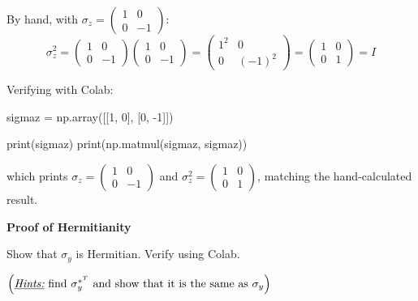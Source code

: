 \documentclass[a4paper, 10pt]{article}
\begin{document}
\begin{solution}
	By hand, with \( \sigma_z = \begin{pmatrix} 1 & 0 \\ 0 & -1 \end{pmatrix} \):
	\[
		\sigma_z^2 = \begin{pmatrix}
			1 & 0  \\
			0 & -1
		\end{pmatrix}\begin{pmatrix}
			1 & 0  \\
			0 & -1
		\end{pmatrix} = \begin{pmatrix}
			1^2 & 0      \\
			0   & (-1)^2
		\end{pmatrix} = \begin{pmatrix}
			1 & 0 \\
			0 & 1
		\end{pmatrix} = I
	\]

	Verifying with Colab:
	\begin{codingbox}
sigmaz = np.array([[1, 0], [0, -1]])

print(sigmaz)
print(np.matmul(sigmaz, sigmaz))
\end{codingbox}
	which prints \( \sigma_z = \begin{pmatrix} 1 & 0 \\ 0 & -1 \end{pmatrix} \) and \( \sigma_z^2 = \begin{pmatrix} 1 & 0 \\ 0 & 1 \end{pmatrix} \), matching the hand-calculated result.
\end{solution}

\begin{problem}
\textbf{Proof of Hermitianity}
\par Show that \( \sigma_y \) is Hermitian. Verify using Colab.
\par \( \left(\underline{\textit{Hints:}} \text{ find } \sigma_y^{*^T} \text{ and show that it is the same as } \sigma_y\right) \)
\end{problem}
\end{document}

